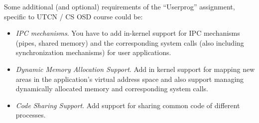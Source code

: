 Some additional (and optional) requirements of the ``Userprog'' assignment, specific to UTCN / CS OSD course could be: 
\begin{itemize}
    \item \textit{IPC mechanisms}. You have to add in-kernel support for IPC mechanisms (pipes, shared memory) and the corresponding system calls (also including synchronization mechanisms) for user applications.
    
    \item \textit{Dynamic Memory Allocation Support}. Add in kernel support for mapping new areas in the application's virtual address space and also support managing dynamically allocated memory and corresponding system calls.
    
    \item \textit{Code Sharing Support}. Add support for sharing common code of different processes.
   
\end{itemize}


